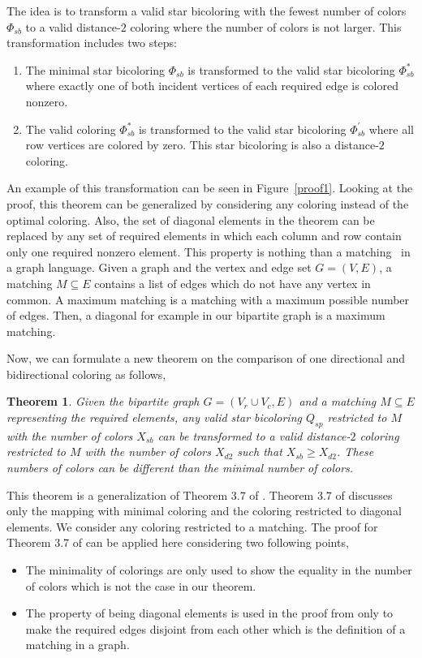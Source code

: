 \documentclass[12pt, twoside,a4paper,toc=bibliography]{scrbook}
\newtheorem{theorem}{Theorem}
\newcommand{\figref}[1]{Figure~\protect\ref{#1}}
\begin{document}
The idea is to transform a valid star bicoloring with the fewest number of colors $\Phi_{sb}$ to 
a valid distance-$2$ coloring where the number of colors is not larger.
This transformation includes two steps:
\begin{enumerate}
\item The minimal star bicoloring $\Phi_{sb}$ is transformed 
to the valid star bicoloring $\Phi_{sb}^{*}$ 
where exactly one of both incident vertices of each required edge is colored nonzero.
\item The valid coloring $\Phi_{sb}^{*}$ is transformed 
to the valid star bicoloring $\Phi_{sb}^{'}$ where all row vertices are colored by zero.
This star bicoloring is also a distance-$2$ coloring.
\end{enumerate}
An example of this transformation can be seen in \figref{proof1}. 
Looking at the proof, this theorem can be generalized by considering any
coloring instead of the optimal coloring.
Also, the set of diagonal elements in the theorem
can be replaced by any set of required elements
in which each column and row contain only one required nonzero element.
This property is nothing than a matching~\cite{bondy2008graph} in a graph language.
Given a graph and the vertex and edge set $G=(V,E)$, a matching $M\subseteq E$ contains
a list of edges which do not have any vertex in common.
A maximum matching is a matching with a maximum possible number of edges.
Then, a diagonal for example in our bipartite graph is a maximum matching.

Now, we can formulate a new theorem on the comparison of one directional and
bidirectional coloring as follows,
\begin{theorem}
\label{t.matching}
Given the bipartite graph $G=(V_r\cup V_c,E)$ and a matching $M\subseteq E$ representing
the required elements, any valid star bicoloring $Q_{sp}$ restricted to $M$
with the number of colors $X_{sb}$
can be transformed to a valid distance-$2$ coloring restricted to $M$
with the number of colors $X_{d2}$ such that $X_{sb} \geq X_{d2}$.
These numbers of colors can be different than the minimal number of colors.
\end{theorem}
This theorem is a generalization of Theorem 3.7 of \cite{Lulfesmann2012Fap}.
Theorem 3.7 of \cite{Lulfesmann2012Fap} discusses only the mapping with minimal coloring
and the coloring restricted to diagonal elements. We consider any coloring
restricted to a matching. 
The proof for Theorem 3.7 of \cite{Lulfesmann2012Fap} can be applied here considering two following points,
\begin{itemize}
\item The minimality of colorings are only used to show the equality in the number of colors which is not
the case in our theorem.
\item The property of being diagonal elements is used in the proof from \cite{Lulfesmann2012Fap} only to
make the required edges disjoint from each other which is the definition of a matching in a graph.
\end{itemize}
\end{document}
